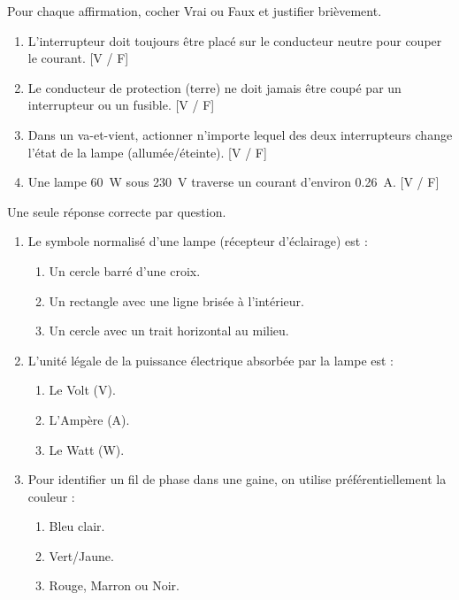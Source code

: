 \documentclass[11pt]{article}
\begin{document}
\begin{exercice}
Pour chaque affirmation, cocher Vrai ou Faux et justifier brièvement.
\begin{enumerate}
    \item L'interrupteur doit toujours être placé sur le conducteur neutre pour couper le courant. \hfill [V / F]
    \item Le conducteur de protection (terre) ne doit jamais être coupé par un interrupteur ou un fusible. \hfill [V / F]
    \item Dans un va-et-vient, actionner n'importe lequel des deux interrupteurs change l'état de la lampe (allumée/éteinte). \hfill [V / F]
    \item Une lampe \SI{60}{W} sous \SI{230}{V} traverse un courant d'environ \SI{0,26}{A}. \hfill [V / F]
\end{enumerate}
\end{exercice}

\begin{exercice}
Une seule réponse correcte par question.
\begin{enumerate}
    \item Le symbole normalisé d'une lampe (récepteur d'éclairage) est :
    \begin{enumerate}
        \item Un cercle barré d'une croix.
        \item Un rectangle avec une ligne brisée à l'intérieur.
        \item Un cercle avec un trait horizontal au milieu.
    \end{enumerate}
    \item L'unité légale de la puissance électrique absorbée par la lampe est :
    \begin{enumerate}
        \item Le Volt (V).
        \item L'Ampère (A).
        \item Le Watt (W).
    \end{enumerate}
    \item Pour identifier un fil de phase dans une gaine, on utilise préférentiellement la couleur :
    \begin{enumerate}
        \item Bleu clair.
        \item Vert/Jaune.
        \item Rouge, Marron ou Noir.
    \end{enumerate}
\end{enumerate}
\end{exercice}
\end{document}
